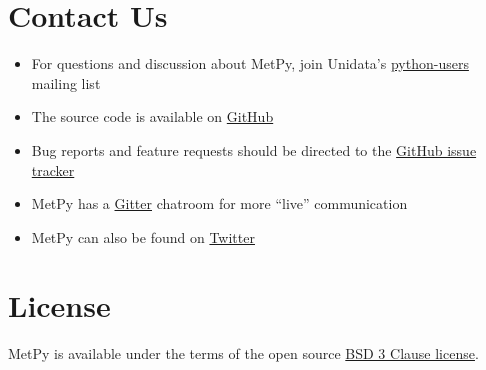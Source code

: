 \documentclass[letterpaper,10pt,english]{sphinxmanual}
\begin{document}
\chapter{Contact Us}
\label{\detokenize{index:contact-us}}\begin{itemize}
\item {} 
For questions and discussion about MetPy, join Unidata's \href{https://www.unidata.ucar.edu/support/\#mailinglists}{python-users}
mailing list

\item {} 
The source code is available on \href{https://github.com/Unidata/MetPy}{GitHub}

\item {} 
Bug reports and feature requests should be directed to the
\href{https://github.com/Unidata/MetPy/issues}{GitHub issue tracker}

\item {} 
MetPy has a \href{https://gitter.im/Unidata/MetPy}{Gitter} chatroom for more ``live'' communication

\item {} 
MetPy can also be found on \href{https://twitter.com/MetPy}{Twitter}

\end{itemize}


\chapter{License}
\label{\detokenize{index:license}}\label{\detokenize{index:id1}}
MetPy is available under the terms of the open source \href{https://raw.githubusercontent.com/Unidata/MetPy/master/LICENSE}{BSD 3 Clause license}.



\renewcommand{\indexname}{Index}
\printindex
\end{document}
